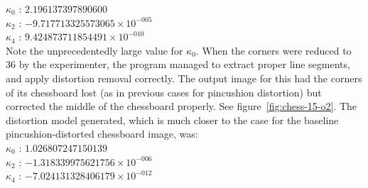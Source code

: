 \begin{enumerate}
   $ \kappa_{0}$ : $2.196137397890600$\\
   $ \kappa_{2}$ : $-9.717713325573065 \times 10^{-005}$\\
   $ \kappa_{4}$ : $9.424873711854491 \times 10^{-010}$\\
Note the unprecedentedly large value for $\kappa_{0}$. When the corners were reduced to 36 by the experimenter, the program managed to extract proper line segments, and apply distortion removal correctly. The output image for this had the corners of its chessboard lost (as in previous cases for pincushion distortion) but corrected the middle of the chessboard properly. See figure~\ref{fig:chess-15-o2}. The distortion model generated, which is much closer to the case for the baseline pincushion-distorted chessboard image, was:\\
   $ \kappa_{0}$ : $1.026807247150139$\\
   $ \kappa_{2}$ : $-1.318339975621756 \times 10^{-006}$\\
   $ \kappa_{4}$ : $-7.024131328406179 \times 10^{-012}$
\begin{figure}[h]
  \centering

\end{figure}
\end{enumerate}
